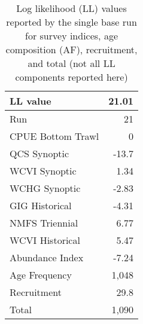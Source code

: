 \documentclass[11pt]{book}
\begin{document}
\setlength{\tabcolsep}{6pt}
\begin{table}[ht]
\centering
\caption{Log likelihood (LL) values reported by the single base run for survey indices, age composition (AF), recruitment, and total (not all LL components reported here)} 
\label{tab:pop.log.likes}
\begin{tabular}{lr}
  \\[-1.0ex] \hline
LL value & 21.01 \\ 
  \hline
Run & 21 \\ 
  CPUE Bottom Trawl & 0 \\ 
  QCS Synoptic & -13.7 \\ 
  WCVI Synoptic & 1.34 \\ 
  WCHG Synoptic & -2.83 \\ 
  GIG Historical & -4.31 \\ 
  NMFS Triennial & 6.77 \\ 
  WCVI Historical & 5.47 \\ 
  Abundance Index & -7.24 \\ 
  Age Frequency & 1,048 \\ 
  Recruitment & 29.8 \\ 
  Total & 1,090 \\ 
   \hline
\end{tabular}
\end{table}

%
%

%

\clearpage

\clearpage


\graphicspath{{C:/Users/haighr/Files/GFish/PSARC23/POP/Data/SS/POP2023/Run21/MCMC.21.01.v3a/}}
\end{document}
